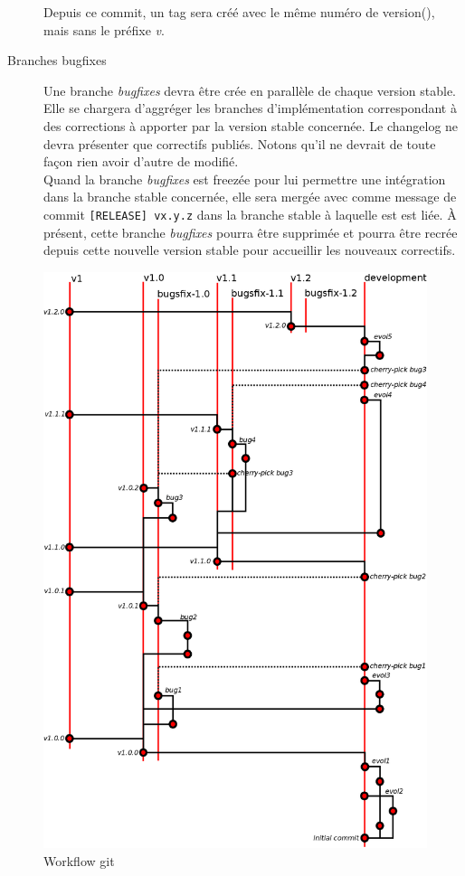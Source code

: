 \begin{description}
		Depuis ce commit, un tag sera créé avec le même numéro de version(), mais sans le préfixe \emph{v}.
	\item[Branches bugfixes]
		Une branche \emph{bugfixes} devra être crée en parallèle de chaque version stable.
		Elle se chargera d'aggréger les branches d'implémentation correspondant à des corrections à apporter par la version stable concernée.
		Le changelog ne devra présenter que correctifs publiés.
		Notons qu'il ne devrait de toute façon rien avoir d'autre de modifié.\\

		Quand la branche \emph{bugfixes} est freezée pour lui permettre une intégration dans la branche stable concernée, elle sera mergée avec comme message de commit {\tt[RELEASE] vx.y.z} dans la branche stable à laquelle est est liée.
		À présent, cette branche \emph{bugfixes} pourra être supprimée et pourra être recrée depuis cette nouvelle version stable pour accueillir les nouveaux correctifs.
\end{description}

\begin{figure}
	\centering
	\includegraphics[scale=0.3]{part/developpement/code/fig_workflow_git.png}
	\caption{Workflow git}
	\label{fig_3.2_git}
\end{figure}
